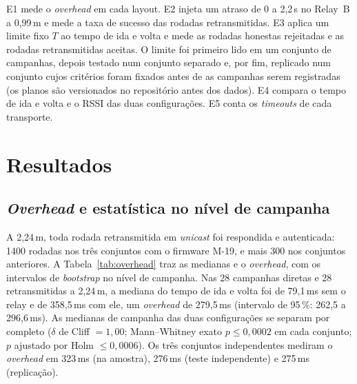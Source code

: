 \documentclass{ieeeaccess}
\begin{document}
E1 mede o \emph{overhead} em cada layout. E2 injeta um atraso de 0 a 2,2\,s no Relay~B a 0,99\,m e mede a taxa de sucesso das rodadas retransmitidas. E3 aplica um limite fixo $T$ ao tempo de ida e volta e mede as rodadas honestas rejeitadas e as rodadas retransmitidas aceitas. O limite foi primeiro lido em um conjunto de campanhas, depois testado num conjunto separado e, por fim, replicado num conjunto cujos critérios foram fixados antes de as campanhas serem registradas (os planos são versionados no repositório antes dos dados). E4 compara o tempo de ida e volta e o RSSI das duas configurações. E5 conta os \emph{timeouts} de cada transporte.

\section{Resultados}
\label{sec:results}

\subsection{\emph{Overhead} e estatística no nível de campanha}

A 2,24\,m, toda rodada retransmitida em \emph{unicast} foi respondida e autenticada: 1400 rodadas nos três conjuntos com o firmware M-19, e mais 300 nos conjuntos anteriores. A Tabela~\ref{tab:overhead} traz as medianas e o \emph{overhead}, com os intervalos de \emph{bootstrap} no nível de campanha. Nas 28 campanhas diretas e 28 retransmitidas a 2,24\,m, a mediana do tempo de ida e volta foi de 79,1\,ms sem o relay e de 358,5\,ms com ele, um \emph{overhead} de 279,5\,ms (intervalo de 95\,\%: 262,5 a 296,6\,ms). As medianas de campanha das duas configurações se separam por completo ($\delta$ de Cliff $=1{,}00$; Mann--Whitney exato $p\le 0{,}0002$ em cada conjunto; $p$ ajustado por Holm $\le 0{,}0006$). Os três conjuntos independentes mediram o \emph{overhead} em 323\,ms (na amostra), 276\,ms (teste independente) e 275\,ms (replicação).
\end{document}
